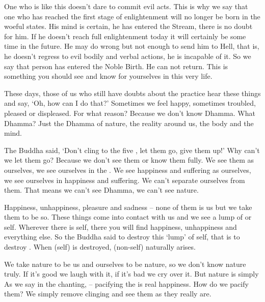 One who is like this doesn't dare to commit evil acts. This is why we say that one who has reached the first stage of enlightenment will no longer be born in the woeful states. His mind is certain, he has entered the Stream, there is no doubt for him. If he doesn't reach full enlightenment today it will certainly be some time in the future. He may do wrong but not enough to send him to Hell, that is, he doesn't regress to evil bodily and verbal actions, he is incapable of it. So we say that person has entered the Noble Birth. He can not return. This is something you should see and know for yourselves in this very life.

These days, those of us who still have doubts about the practice hear these things and say, `Oh, how can I do that?' Sometimes we feel happy, sometimes troubled, pleased or displeased. For what reason? Because we don't know Dhamma. What Dhamma? Just the Dhamma of nature, the reality around us, the body and the mind.

The Buddha said, `Don't cling to the five , let them go, give them up!' Why can't we let them go? Because we don't see them or know them fully. We see them as ourselves, we see ourselves in the . We see happiness and suffering as ourselves, we see ourselves in happiness and suffering. We can't separate ourselves from them. That means we can't see Dhamma, we can't see nature.

Happiness, unhappiness, pleasure and sadness -- none of them is us but we take them to be so. These things come into contact with us and we see a lump of  or self. Wherever there is self, there you will find happiness, unhappiness and everything else. So the Buddha said to destroy this `lump' of self, that is to destroy . When  (self) is destroyed,  (non-self) naturally arises.

We take nature to be us and ourselves to be nature, so we don't know nature truly. If it's good we laugh with it, if it's bad we cry over it. But nature is simply  As we say in the chanting,  -- pacifying the  is real happiness. How do we pacify them? We simply remove clinging and see them as they really are.

